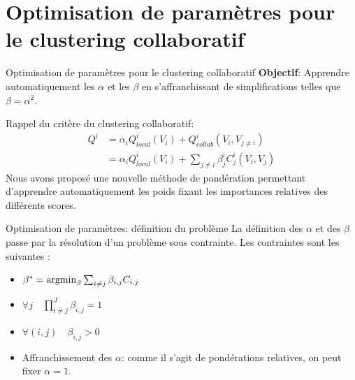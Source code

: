 \documentclass[hyperref={pdfpagelabels=false}]{beamer}
\begin{document}
    \section{Optimisation de paramètres pour le clustering collaboratif}

    \begin{frame}{Optimisation de paramètres pour le clustering collaboratif}
        \textbf{Objectif}: Apprendre automatiquement les $\alpha$ et les
        $\beta$ en s'affranchissant de simplifications telles que $\beta =
        \alpha^2$.

        Rappel du critère du clustering collaboratif:
        \begin{align*}
            Q^i &= \alpha_i Q^i_{local}(V_i) + Q^i_{collab}(V_i, 
            V_{j\neq i})\\
            &= \alpha_i Q^i_{local}(V_i) + \sum_{j\neq i} \beta^i_j 
            C_j^i(V_i, V_j)
        \end{align*}
        Nous avons proposé une nouvelle méthode de pondération permettant
        d'apprendre automatiquement les poids fixant les importances
        relatives des différents scores.\\
    \end{frame}

    \begin{frame}{Optimisation de paramètres: définition du problème}
        La définition des $\alpha$ et des $\beta$ passe par la résolution
        d'un problème sous contrainte. Les contraintes sont les suivantes :

        \begin{itemize}
            \item<2-> $\beta^* =  
                \operatornamewithlimits{argmin}_{\beta}  \sum_{i \neq j}
        \beta_{i,j}  C _{i,j} $
            \item<3-> $\forall j \quad \prod_{i \neq j}^J \beta_{i,j} = 
                1$
            \item<4-> $\forall (i,j) \quad \beta_{i,j} >0$
            \item<5->{Affranchissement des $\alpha$: comme il s'agit de 
                pondérations relatives, on peut fixer $\alpha=1$.}
        \end{itemize}

    \end{frame}
\end{document}
